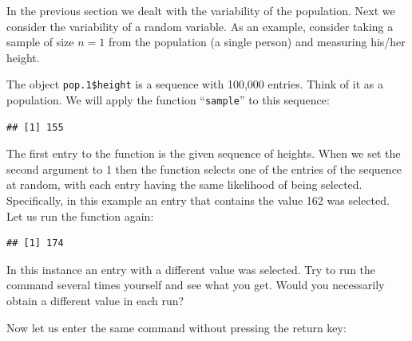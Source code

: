 \documentclass[]{krantz}
\makeatletter
\newenvironment{Shaded}{\begin{snugshade}}{\end{snugshade}}
\newcommand{\KeywordTok}[1]{\textcolor[rgb]{0.13,0.29,0.53}{\textbf{#1}}}
\newcommand{\DecValTok}[1]{\textcolor[rgb]{0.00,0.00,0.81}{#1}}
\newcommand{\OperatorTok}[1]{\textcolor[rgb]{0.81,0.36,0.00}{\textbf{#1}}}
\newcommand{\NormalTok}[1]{#1}
\newenvironment{kframe}{%
\medskip{}
\setlength{\fboxsep}{.8em}
 \def\at@end@of@kframe{}%
 \ifinner\ifhmode%
  \def\at@end@of@kframe{\end{minipage}}%
  \begin{minipage}{\columnwidth}%
 \fi\fi%
 \def\FrameCommand##1{\hskip\@totalleftmargin \hskip-\fboxsep
 \colorbox{shadecolor}{##1}\hskip-\fboxsep
     \hskip-\linewidth \hskip-\@totalleftmargin \hskip\columnwidth}%
 \MakeFramed {\advance\hsize-\width
   \@totalleftmargin\z@ \linewidth\hsize
   \@setminipage}}%
 {\par\unskip\endMakeFramed%
 \at@end@of@kframe}
\renewenvironment{Shaded}{\begin{kframe}}{\end{kframe}}
\theoremstyle{definition}
\theoremstyle{definition}
\theoremstyle{definition}
\theoremstyle{remark}
\makeatother
\begin{document}
In the previous section we dealt with the variability of the population.
Next we consider the variability of a random variable. As an example,
consider taking a sample of size \(n=1\) from the population (a single
person) and measuring his/her height.

The object \texttt{pop.1\$height} is a sequence with 100,000 entries.
Think of it as a population. We will apply the function
``\texttt{sample}'' to this sequence:

\begin{Shaded}
\end{Shaded}

\begin{verbatim}
## [1] 155
\end{verbatim}

The first entry to the function is the given sequence of heights. When
we set the second argument to 1 then the function selects one of the
entries of the sequence at random, with each entry having the same
likelihood of being selected. Specifically, in this example an entry
that contains the value 162 was selected. Let us run the function again:

\begin{Shaded}
\end{Shaded}

\begin{verbatim}
## [1] 174
\end{verbatim}

In this instance an entry with a different value was selected. Try to
run the command several times yourself and see what you get. Would you
necessarily obtain a different value in each run?

Now let us enter the same command without pressing the return key:

\begin{Shaded}
\end{Shaded}
\end{document}
